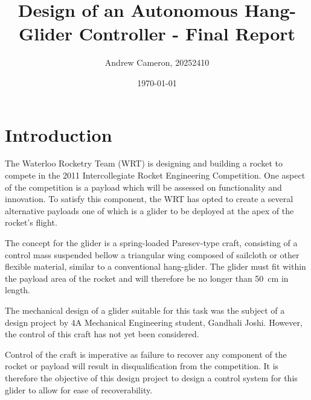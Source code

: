 \documentclass{sydeStyle}
\title{
Design of an Autonomous Hang-Glider Controller - Final Report
}
\date{\today}
\author{Andrew Cameron, 20252410}
\begin{document}
\maketitle

\tableofcontents

\chapter{Introduction}

The Waterloo Rocketry Team (WRT) is designing and building a rocket to compete
in the 2011 Intercollegiate Rocket Engineering Competition. One aspect of the
competition is a payload which will be assessed on functionality and
innovation\cite{IREC}. To satisfy this component, the WRT has opted to create a
several alternative payloads one of which is a glider to be deployed at the apex
of the rocket's flight.

The concept for the glider is a spring-loaded Paresev-type craft,
consisting of a control mass suspended bellow a triangular wing composed of
sailcloth or other flexible material, similar to a conventional
hang-glider\cite{wiki:parasev}. The glider must fit within the payload area of
the rocket and will therefore be no longer than 50~cm in length.

The mechanical design of a glider suitable for this task was the subject of a
design project by 4A Mechanical Engineering student, Gandhali Joshi. However,
the control of this craft has not yet been considered.

Control of the craft is imperative as failure to recover any component of
the rocket or payload will result in disqualification from the
competition\cite{IREC}. It is therefore the objective of this design project to
design a control system for this glider to allow for ease of recoverability.
\end{document}

